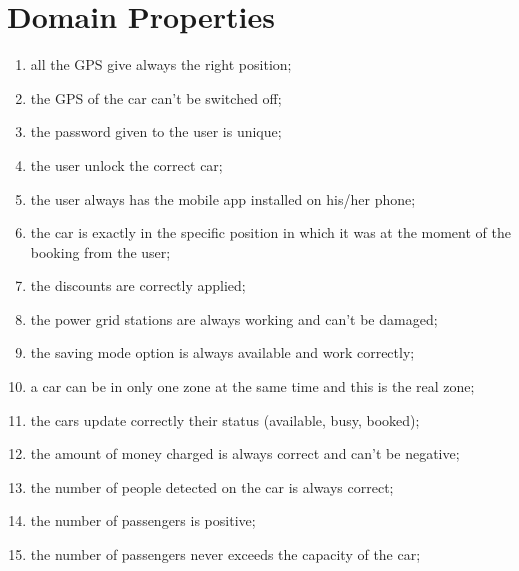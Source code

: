 \section{Domain Properties}
\begin{enumerate}
	\item all the GPS give always the right position;
	\item the GPS of the car can't be switched off;
	\item the password given to the user is unique;
	\item the user unlock the correct car;
	\item the user always has the mobile app installed on his/her phone;
	\item the car is exactly in the specific position in which it was at the moment of the booking from the user;
	\item the discounts are correctly applied;
	\item the power grid stations are always working and can't be damaged;
	\item the saving mode option is always available and work correctly;
	\item a car can be in only one zone at the same time and this is the real zone;
	\item the cars update correctly their status (available, busy, booked);
    \item the amount of money charged is always correct and can't be negative;
    \item the number of people detected on the car is always correct;
    \item the number of passengers is positive;
    \item the number of passengers never exceeds the capacity of the car;

    
  
   
    
\end{enumerate}
